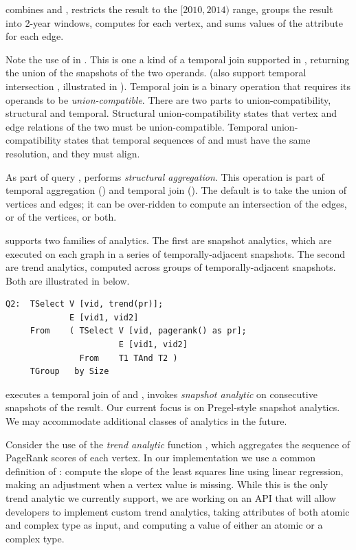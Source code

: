  combines \tgs {} and , restricts the
result to the $[2010, 2014)$ range, groups the result into 2-year
  windows, computes  for each vertex, and sums
  values of the attribute  for each edge.

Note the use of  in .  This is one a kind of a
temporal join supported in \ql, returning the union of the snapshots
of the two operands.  (\ql also support temporal intersection
, illustrated in ).  Temporal join is a binary
operation that requires its operands to be {\em union-compatible}.
There are two parts to \tg union-compatibility, structural and
temporal.  Structural union-compatibility states that vertex and edge
relations of the two \tgs must be union-compatible.  Temporal
union-compatibility states that temporal sequences of  and
 must have the same resolution, and they must align. 

As part of query , \ql performs {\em structural
  aggregation}.  This operation is part of temporal aggregation
() and temporal join ().  The default is to
take the union of vertices and edges; it can be over-ridden to compute
an intersection of the edges, or of the vertices, or both.

\ql supports two families of analytics.  The first are snapshot
analytics, which are executed on each graph in a series of
temporally-adjacent snapshots.  The second are trend analytics,
computed across groups of temporally-adjacent snapshots.  Both are
illustrated in  below.

{\footnotesize
\begin{verbatim}
Q2:  TSelect V [vid, trend(pr)];
             E [vid1, vid2]  
     From    ( TSelect V [vid, pagerank() as pr];   
                       E [vid1, vid2]
               From    T1 TAnd T2 )
     TGroup   by Size
\end{verbatim}
}

 executes a temporal join of  and ,
invokes  {\em snapshot analytic} on consecutive
snapshots of the result.  Our current focus is on Pregel-style
snapshot analytics.  We may accommodate additional classes of
analytics in the future.

Consider the use of the {\em trend analytic} function
, which aggregates the sequence of PageRank scores of
each vertex.  In our implementation we use a common definition of
: compute the slope of the least squares line using
linear regression, making an adjustment when a vertex value is
missing.  While this is the only trend analytic we currently support,
we are working on an API that will allow developers to implement
custom trend analytics, taking attributes of both atomic and complex
type as input, and computing a value of either an atomic or a complex
type.


